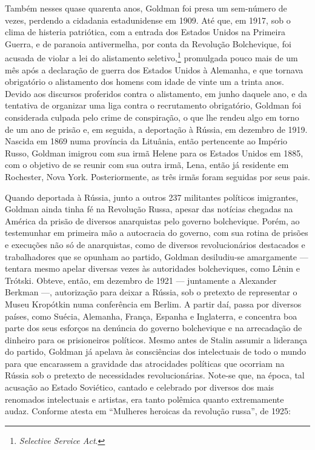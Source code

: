 Também nesses quase quarenta anos, Goldman foi presa um sem-número de
vezes, perdendo a cidadania estadunidense em 1909. Até que, em 1917, sob
o clima de histeria patriótica, com a entrada dos Estados Unidos na
Primeira Guerra, e de paranoia antivermelha, por conta da Revolução
Bolchevique, foi acusada de violar a lei do alistamento seletivo,\footnote{\textit{Selective Service Act}.} promulgada pouco mais de um mês após
a declaração de guerra dos Estados Unidos à Alemanha, e que tornava
obrigatório o alistamento dos homens com idade de vinte um a trinta
anos. Devido aos discursos proferidos contra o alistamento, em junho
daquele ano, e da tentativa de organizar uma liga contra o recrutamento
obrigatório, Goldman foi considerada culpada pelo crime de conspiração,
o que lhe rendeu algo em torno de um ano de prisão e, em seguida, a
deportação à Rússia, em dezembro de 1919. Nascida em 1869 numa província da
Lituânia, então pertencente ao Império Russo, Goldman imigrou
com sua irmã Helene para os Estados Unidos em 1885, com o objetivo de
se reunir com sua outra irmã, Lena, então já residente em Rochester,
Nova York. Posteriormente, as três irmãs foram seguidas por seus pais.

Quando deportada à Rússia, junto a outros 237
militantes políticos imigrantes, Goldman ainda tinha fé na Revolução
Russa, apesar das notícias chegadas na América da prisão de diversos
anarquistas pelo governo bolchevique. Porém, ao testemunhar em
primeira mão a autocracia do governo, com sua rotina de prisões e
execuções não só de anarquistas, como de diversos revolucionários
destacados e trabalhadores que se opunham ao partido,
Goldman desiludiu-se amargamente --- tentara mesmo apelar diversas vezes às autoridades bolcheviques, como Lênin e Trótski.
Obteve, então, em dezembro de 1921 --- juntamente a Alexander
Berkman ---, autorização para deixar a Rússia, sob o pretexto de
representar o Museu Kropótkin numa conferência em Berlim. A partir daí,
passa por diversos países, como Suécia, Alemanha, França, Espanha e
Inglaterra, e concentra boa parte dos seus esforços na denúncia do
governo bolchevique e na arrecadação de dinheiro para os prisioneiros
políticos. Mesmo antes de Stalin assumir a liderança do partido, Goldman
já apelava às consciências dos intelectuais de todo o mundo para que
encarassem a gravidade das atrocidades políticas que ocorriam
na Rússia sob o pretexto de necessidades revolucionárias. Note-se
que, na época, tal acusação ao Estado Soviético, cantado e
celebrado por diversos dos mais renomados intelectuais e artistas, era
tanto polêmica quanto extremamente audaz. Conforme atesta
em ``Mulheres heroicas da revolução russa'', de 1925:

